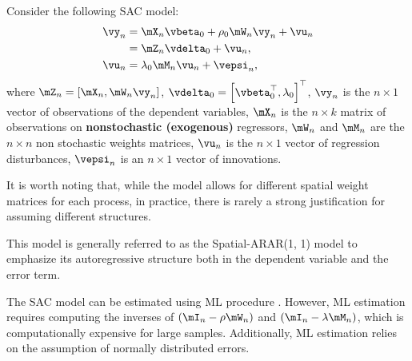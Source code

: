 \documentclass[english,12pt]{book}\usepackage[]{graphicx}\usepackage[]{xcolor}
\begin{document}
Consider the following SAC model:
\begin{equation}\label{eq:model_gmm_sac}
\begin{aligned}
	\vy_n & = \mX_n\vbeta_0 + \rho_0\mW_n\vy_n + \vu_n   \\
	     & = \mZ_n\vdelta_0 + \vu_n,\\
	\vu_n  & = \lambda_0 \mM_n \vu_n + \vepsi_n,
\end{aligned}
\end{equation}
%
where $\mZ_n = \left[\mX_n, \mW_n\vy_n\right]$, $\vdelta_0 = \left[\vbeta_0^\top ,\lambda_0\right]^\top$, $\vy_n$ is the $n\times 1$ vector of observations of the dependent variables, $\mX_n$ is the $n \times k$ matrix of observations on \textbf{nonstochastic (exogenous)} regressors, $\mW_n$ and $\mM_n$ are the $n \times n$ non stochastic weights matrices, $\vu_n$ is the $n \times 1$ vector of regression disturbances, $\vepsi_n$ is an $n \times 1$ vector of innovations. 

It is worth noting that, while the model allows for different spatial weight matrices for each process, in practice, there is rarely a strong justification for assuming different structures.

\begin{remark}
This model is generally referred to as the Spatial-ARAR(1, 1) model to emphasize its autoregressive structure both in the dependent variable and the error term. 
\end{remark}

The SAC model can be estimated using ML procedure \citep[see][]{anselin1988spatial}. However, ML estimation requires computing the inverses of $\left(\mI_n - \rho\mW_n\right)$ and $\left(\mI_n - \lambda \mM_n\right)$, which is computationally expensive for large samples. Additionally, ML estimation relies on the assumption of normally distributed errors.
\end{document}

